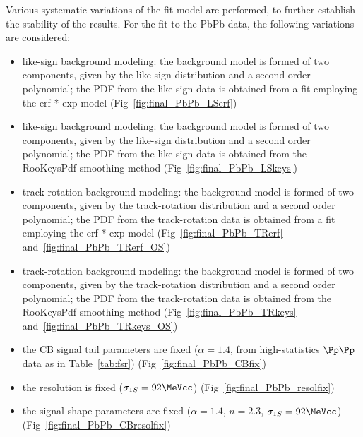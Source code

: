 Various systematic variations of the fit model are performed, to further establish the stability of the results. 
For the fit to the PbPb data, the following variations are considered:
\begin{itemize}
\item like-sign background modeling: the background model is formed of two components, given by the like-sign distribution and a second order polynomial; the PDF from the like-sign data is obtained from a fit employing the erf * exp model (Fig~\ref{fig:final_PbPb_LSerf}) 
\item like-sign background modeling: the background model is formed of two components, given by the like-sign distribution and a second order polynomial; the PDF from the like-sign data is obtained from the RooKeysPdf smoothing method (Fig~\ref{fig:final_PbPb_LSkeys})
\item track-rotation background modeling: the background model is formed of two components, given by the track-rotation distribution and a second order polynomial; the PDF from the track-rotation data is obtained from a fit employing the erf * exp model (Fig~\ref{fig:final_PbPb_TRerf} and~\ref{fig:final_PbPb_TRerf_OS})
\item track-rotation background modeling: the background model is formed of two components, given by the track-rotation distribution and a second order polynomial; the PDF from the track-rotation data is obtained from the RooKeysPdf smoothing method (Fig~\ref{fig:final_PbPb_TRkeys} and~\ref{fig:final_PbPb_TRkeys_OS})
\item the CB signal tail parameters are fixed ($\alpha=1.4$, from high-statistics $\Pp\Pp$ data as in Table~\ref{tab:fsr}) (Fig~\ref{fig:final_PbPb_CBfix}) %
\item the resolution is fixed ($\sigma_{1S}=92\MeVcc$) (Fig~\ref{fig:final_PbPb_resolfix})
\item the signal shape parameters are fixed ($\alpha=1.4$, $n=2.3$, $\sigma_{1S}=92\MeVcc$) (Fig~\ref{fig:final_PbPb_CBresolfix})
\end{itemize}

